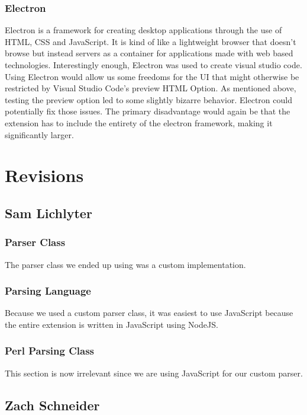 \documentclass[letterpaper,10pt,titlepage,draftclsnofoot,onecolumn,onesided] {IEEEtran}
\begin{document}
\subsubsection{Electron}
Electron is a framework for creating desktop applications through the use of HTML, CSS and JavaScript. 
It is kind of like a lightweight browser that doesn't browse but instead servers as a container for applications made with web based technologies. 
Interestingly enough, Electron was used to create visual studio code. 
Using Electron would allow us some freedoms for the UI that might otherwise be restricted by Visual Studio Code's preview HTML Option. 
As mentioned above, testing the preview option led to some slightly bizarre behavior. 
Electron could potentially fix those issues. 
The primary disadvantage would again be that the extension has to include the entirety of the electron framework, making it significantly larger.

\pagebreak

\section{Revisions}

\subsection{Sam Lichlyter}
\subsubsection{Parser Class}
The parser class we ended up using was a  custom implementation. 

\subsubsection{Parsing Language}
Because we used a custom parser class, it was easiest to use JavaScript because the entire extension is written in JavaScript using NodeJS.

\subsubsection{Perl Parsing Class}
This section is now irrelevant since we are using JavaScript for our custom parser.

\subsection{Zach Schneider}
\end{document}
